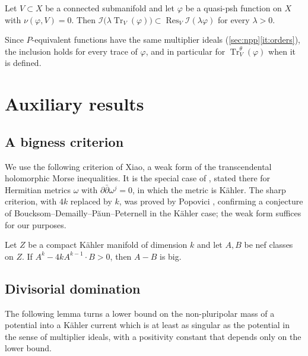 \documentclass[11pt,a4paper]{amsart}
\newcommand{\trc}{\operatorname{Tr}}            %
\newcommand{\rest}[1]{\operatorname{Res}_{#1}}   %
\theoremstyle{definition}
\begin{document}
\begin{theorem}\label{thm:trace-multiplier}
Let $V\subset X$ be a connected submanifold and let $\varphi$ be a
quasi-psh function on $X$ with $\nu(\varphi,V)=0$. Then
$\mathcal I\bigl(\lambda\trc_V(\varphi)\bigr)\subset\rest{V}\mathcal I(\lambda\varphi)$
for every $\lambda>0$.
\end{theorem}

Since $P$-equivalent functions have the same multiplier ideals
(\cref{sec:npp}\ref{it:orders}), the inclusion holds for every trace of
$\varphi$, and in particular for $\trc^\theta_V(\varphi)$ when it is
defined.

\section{Auxiliary results}\label{sec:aux}

\subsection{A bigness criterion}

We use the following criterion of Xiao, a weak form of the transcendental
holomorphic Morse inequalities. It is the special case of
\cite[Theorem~1.4]{Xiao15}, stated there for Hermitian metrics $\omega$
with $\partial\bar\partial\omega^j=0$, in which the metric is K\"ahler.
The sharp criterion, with $4k$ replaced by $k$, was proved by Popovici
\cite[Theorem~1.1]{Pop16}, confirming a conjecture of
Boucksom--Demailly--P\u{a}un--Peternell in the K\"ahler case; the weak
form suffices for our purposes.

\begin{theorem}\label{thm:nef-difference}
Let $Z$ be a compact K\"ahler manifold of dimension $k$ and let
$A,B$ be nef classes on $Z$. If $A^k-4kA^{k-1}\cdot B>0$, then $A-B$ is
big.
\end{theorem}

\subsection{Divisorial domination}

The following lemma turns a lower bound on the non-pluripolar mass of a
potential into a K\"ahler current which is at least as singular as the
potential in the sense of multiplier ideals, with a positivity constant
that depends only on the lower bound.
\end{document}
